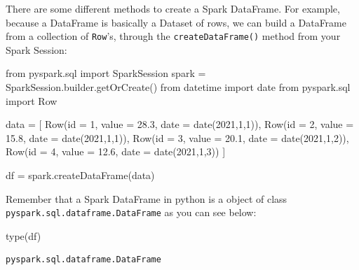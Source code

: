 \documentclass[
  11pt,
  letterpaper,
  DIV=11,
  numbers=noendperiod]{scrreprt}
\newenvironment{Shaded}{\begin{snugshade}}{\end{snugshade}}
\newcommand{\BuiltInTok}[1]{\textcolor[rgb]{0.00,0.23,0.31}{#1}}
\newcommand{\DecValTok}[1]{\textcolor[rgb]{0.68,0.00,0.00}{#1}}
\newcommand{\FloatTok}[1]{\textcolor[rgb]{0.68,0.00,0.00}{#1}}
\newcommand{\ImportTok}[1]{\textcolor[rgb]{0.00,0.46,0.62}{#1}}
\newcommand{\NormalTok}[1]{\textcolor[rgb]{0.00,0.23,0.31}{#1}}
\newcommand{\OperatorTok}[1]{\textcolor[rgb]{0.37,0.37,0.37}{#1}}
\begin{document}
There are some different methods to create a Spark DataFrame. For
example, because a DataFrame is basically a Dataset of rows, we can
build a DataFrame from a collection of \texttt{Row}'s, through the
\texttt{createDataFrame()} method from your Spark Session:

\begin{Shaded}
\begin{Highlighting}[]
\ImportTok{from}\NormalTok{ pyspark.sql }\ImportTok{import}\NormalTok{ SparkSession}
\NormalTok{spark }\OperatorTok{=}\NormalTok{ SparkSession.builder.getOrCreate()}
\ImportTok{from}\NormalTok{ datetime }\ImportTok{import}\NormalTok{ date}
\ImportTok{from}\NormalTok{ pyspark.sql }\ImportTok{import}\NormalTok{ Row}

\NormalTok{data }\OperatorTok{=}\NormalTok{ [}
\NormalTok{  Row(}\BuiltInTok{id} \OperatorTok{=} \DecValTok{1}\NormalTok{, value }\OperatorTok{=} \FloatTok{28.3}\NormalTok{, date }\OperatorTok{=}\NormalTok{ date(}\DecValTok{2021}\NormalTok{,}\DecValTok{1}\NormalTok{,}\DecValTok{1}\NormalTok{)),}
\NormalTok{  Row(}\BuiltInTok{id} \OperatorTok{=} \DecValTok{2}\NormalTok{, value }\OperatorTok{=} \FloatTok{15.8}\NormalTok{, date }\OperatorTok{=}\NormalTok{ date(}\DecValTok{2021}\NormalTok{,}\DecValTok{1}\NormalTok{,}\DecValTok{1}\NormalTok{)),}
\NormalTok{  Row(}\BuiltInTok{id} \OperatorTok{=} \DecValTok{3}\NormalTok{, value }\OperatorTok{=} \FloatTok{20.1}\NormalTok{, date }\OperatorTok{=}\NormalTok{ date(}\DecValTok{2021}\NormalTok{,}\DecValTok{1}\NormalTok{,}\DecValTok{2}\NormalTok{)),}
\NormalTok{  Row(}\BuiltInTok{id} \OperatorTok{=} \DecValTok{4}\NormalTok{, value }\OperatorTok{=} \FloatTok{12.6}\NormalTok{, date }\OperatorTok{=}\NormalTok{ date(}\DecValTok{2021}\NormalTok{,}\DecValTok{1}\NormalTok{,}\DecValTok{3}\NormalTok{))}
\NormalTok{]}

\NormalTok{df }\OperatorTok{=}\NormalTok{ spark.createDataFrame(data)}
\end{Highlighting}
\end{Shaded}

Remember that a Spark DataFrame in python is a object of class
\texttt{pyspark.sql.dataframe.DataFrame} as you can see below:

\begin{Shaded}
\begin{Highlighting}[]
\BuiltInTok{type}\NormalTok{(df)}
\end{Highlighting}
\end{Shaded}

\begin{verbatim}
pyspark.sql.dataframe.DataFrame
\end{verbatim}
\end{document}
